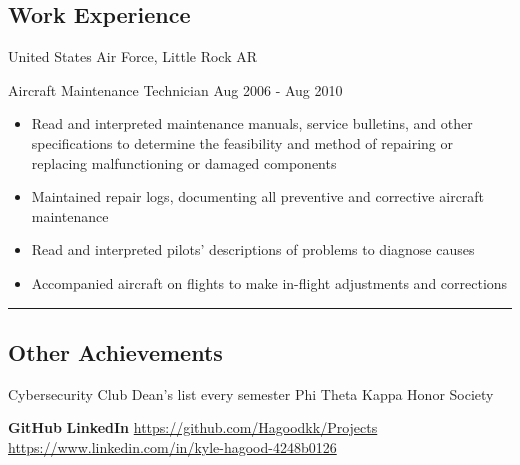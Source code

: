 \documentclass{article}
\begin{document}
\subsection*{Work Experience}
\hspace*{1.0in}United States Air Force, Little Rock AR \newline
\hspace*{1.0in}\begin{itshape}Aircraft Maintenance Technician \hfill Aug 2006 - Aug 2010 \end{itshape}
\begin{itemize}
\setlength{\itemsep}{1pt}
  \setlength{\parskip}{0pt}
  \setlength{\parsep}{0pt}
\setlength{\itemindent}{6em}
\item Read and interpreted maintenance manuals, service bulletins, and   other specifications to determine the 
\hspace*{0.9in}feasibility and method of repairing or replacing malfunctioning or damaged components
\item Maintained repair logs, documenting all preventive and corrective aircraft maintenance
\item Read and interpreted pilots’ descriptions of problems to diagnose causes
\item Accompanied aircraft on flights to make in-flight adjustments and corrections
\end{itemize}

\begin{center} \noindent\rule{14cm}{0.1pt} \end{center}

\subsection*{Other Achievements}
\hspace*{1.0in} Cybersecurity Club \hfill Dean's list every semester \hfill Phi Theta Kappa Honor Society \newline

\vfill

\large \hfill \newline \textbf{GitHub} \hfill \textbf{LinkedIn} \newline 
\normalsize \url{https://github.com/Hagoodkk/Projects} \hfill \url{https://www.linkedin.com/in/kyle-hagood-4248b0126}
\end{document}
